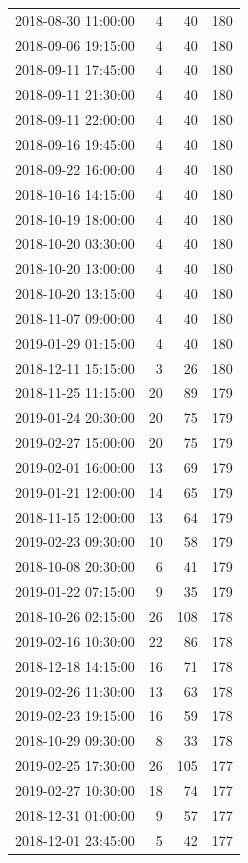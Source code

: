 \begin{tabular}{lrrr}
2018-08-30 11:00:00 & 4 & 40 & 180 \\
2018-09-06 19:15:00 & 4 & 40 & 180 \\
2018-09-11 17:45:00 & 4 & 40 & 180 \\
2018-09-11 21:30:00 & 4 & 40 & 180 \\
2018-09-11 22:00:00 & 4 & 40 & 180 \\
2018-09-16 19:45:00 & 4 & 40 & 180 \\
2018-09-22 16:00:00 & 4 & 40 & 180 \\
2018-10-16 14:15:00 & 4 & 40 & 180 \\
2018-10-19 18:00:00 & 4 & 40 & 180 \\
2018-10-20 03:30:00 & 4 & 40 & 180 \\
2018-10-20 13:00:00 & 4 & 40 & 180 \\
2018-10-20 13:15:00 & 4 & 40 & 180 \\
2018-11-07 09:00:00 & 4 & 40 & 180 \\
2019-01-29 01:15:00 & 4 & 40 & 180 \\
2018-12-11 15:15:00 & 3 & 26 & 180 \\
2018-11-25 11:15:00 & 20 & 89 & 179 \\
2019-01-24 20:30:00 & 20 & 75 & 179 \\
2019-02-27 15:00:00 & 20 & 75 & 179 \\
2019-02-01 16:00:00 & 13 & 69 & 179 \\
2019-01-21 12:00:00 & 14 & 65 & 179 \\
2018-11-15 12:00:00 & 13 & 64 & 179 \\
2019-02-23 09:30:00 & 10 & 58 & 179 \\
2018-10-08 20:30:00 & 6 & 41 & 179 \\
2019-01-22 07:15:00 & 9 & 35 & 179 \\
2018-10-26 02:15:00 & 26 & 108 & 178 \\
2019-02-16 10:30:00 & 22 & 86 & 178 \\
2018-12-18 14:15:00 & 16 & 71 & 178 \\
2019-02-26 11:30:00 & 13 & 63 & 178 \\
2019-02-23 19:15:00 & 16 & 59 & 178 \\
2018-10-29 09:30:00 & 8 & 33 & 178 \\
2019-02-25 17:30:00 & 26 & 105 & 177 \\
2019-02-27 10:30:00 & 18 & 74 & 177 \\
2018-12-31 01:00:00 & 9 & 57 & 177 \\
2018-12-01 23:45:00 & 5 & 42 & 177 \\

\end{tabular}
